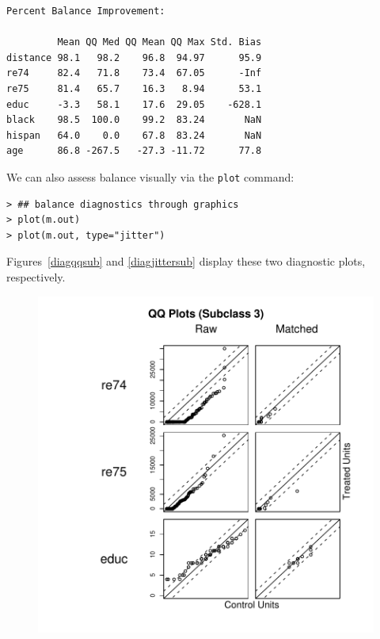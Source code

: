 \documentclass[oneside,letterpaper,titlepage]{article}
\begin{document}
\begin{enumerate}
\begin{verbatim}
Percent Balance Improvement:

         Mean QQ Med QQ Mean QQ Max Std. Bias
distance 98.1   98.2    96.8  94.97      95.9
re74     82.4   71.8    73.4  67.05      -Inf
re75     81.4   65.7    16.3   8.94      53.1
educ     -3.3   58.1    17.6  29.05    -628.1
black    98.5  100.0    99.2  83.24       NaN
hispan   64.0    0.0    67.8  83.24       NaN
age      86.8 -267.5   -27.3 -11.72      77.8
\end{verbatim}

We can also assess balance visually via the \texttt{plot} command: 
\begin{verbatim}
> ## balance diagnostics through graphics
> plot(m.out)
> plot(m.out, type="jitter")
\end{verbatim}    
Figures~\ref{diagqqsub} and \ref{diagjittersub} display these two
diagnostic plots, respectively.
\begin{figure}[tbp]
  \begin{center}
    \includegraphics[scale=.5]{figs/qqplotsub}

\end{center}
\end{figure}
\end{enumerate}
\end{document}
